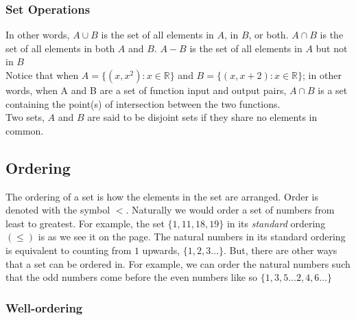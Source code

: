 \documentclass[12pt]{report}
\begin{document}
\subsubsection{Set Operations}

\bigskip

In other words, $A \cup B$ is the set of all elements in $A$, in $B$, or both. $A \cap B$ is the set of all elements in both $A$ and $B$. $A - B$ is the set of all elements in $A$ but not in $B$\vspace{5pt}\\
Notice that when $A=\{(x, x^{2}):x \in \mathbb{R}\}$ and $B=\{(x, x+2):x \in \mathbb{R}\}$; in other words, when A and B are a set of function input and output pairs, $A \cap B$ is a set containing the point(s) of intersection between the two functions.\bigskip\\
Two sets, $A$ and $B$ are said to be disjoint sets if they share no elements in common.

\subsection{Ordering}

\hspace*{\parindent}The ordering of a set is how the elements in the set are arranged. Order is denoted with the symbol $<$. Naturally we would order a set of numbers from least to greatest. For example, the set $\{1, 11, 18, 19\}$ in its \textit{standard} ordering $(\leqslant)$ is as we see it on the page. The natural numbers in its standard ordering is equivalent to counting from $1$ upwards, $\{1, 2,3 \dots\}$. But, there are other ways that a set can be ordered in. For example, we can order the natural numbers such that the odd numbers come before the even numbers like so $\{1, 3, 5 \dots 2, 4, 6 \dots \}$

\subsubsection{Well-ordering}
\end{document}
